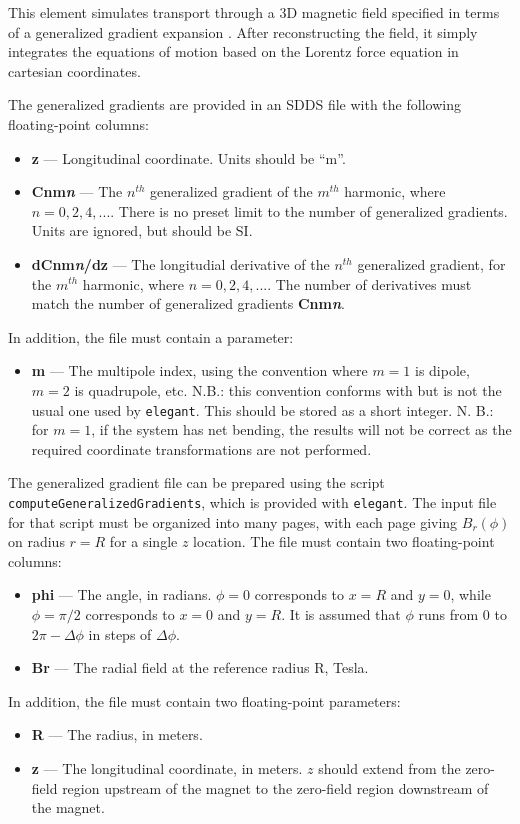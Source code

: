 This element simulates transport through a 3D magnetic field
specified in terms of a generalized gradient expansion \cite{Venturini-NIMA427-387}.
After reconstructing the field, it simply integrates the equations of motion
based on the Lorentz force equation in cartesian coordinates.  

The generalized gradients are provided in an SDDS file with the following floating-point columns:
\begin{itemize}
\item {\bf z} --- Longitudinal coordinate. Units should be ``m''.
\item {\bf Cnm{\em n}} --- The $n^{th}$ generalized gradient of the $m^{th}$ harmonic, where $n=0,2,4,...$.
  There is no preset limit to the number of generalized gradients. Units are ignored,
  but should be SI.
\item {\bf dCnm{\em n}/dz} --- The longitudial derivative of the $n^{th}$ generalized gradient, 
  for the $m^{th}$ harmonic, where $n=0,2,4,...$.
  The number of derivatives must match the number of generalized gradients {\bf Cnm{\em n}}.
\end{itemize}
In addition, the file must contain a parameter:
\begin{itemize}
\item {\bf m} --- The multipole index, using the convention where $m=1$ is dipole, $m=2$ is quadrupole,
  etc. N.B.: this convention conforms with \cite{Venturini-NIMA427-387} but is not the usual one used by
  {\tt elegant}. This should be stored as a short integer.
  N. B.: for $m=1$, if the system has net bending, the results will not be correct as the required coordinate
  transformations are not performed.
\end{itemize}

The generalized gradient file can be prepared using the script {\tt computeGeneralizedGradients}, which is
provided with {\tt elegant}. The input file for that script must be organized into many pages, with
each page giving $B_r(\phi)$ on radius $r=R$ for a single $z$ location. The file must contain two floating-point columns:
\begin{itemize}
\item {\bf phi} --- The angle, in radians. $\phi=0$ corresponds to $x=R$ and $y=0$, while $\phi=\pi/2$ corresponds
  to $x=0$ and $y=R$. It is assumed that $\phi$ runs from $0$ to $2\pi - \Delta \phi$ in steps of $\Delta \phi$.
\item {\bf Br} --- The radial field at the reference radius R, Tesla.
\end{itemize}
In addition, the file must contain two floating-point parameters:
\begin{itemize}
\item {\bf R} --- The radius, in meters. 
\item {\bf z} --- The longitudinal coordinate, in meters. $z$ should extend from the zero-field region upstream of the magnet to 
  the zero-field region downstream of the magnet.
\end{itemize}


